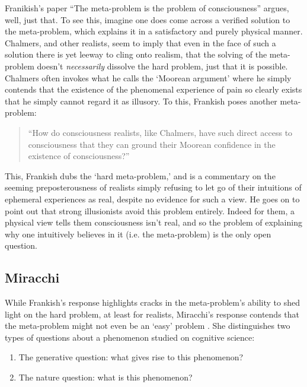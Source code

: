 \documentclass[11pt]{article}
\begin{document}
Franikish's paper ``The meta-problem is the problem of consciousness'' argues, well, just that. To see this, imagine one does come across a verified solution to the meta-problem, which explains it in a satisfactory and purely physical manner. Chalmers, and other realists, seem to imply that even in the face of such a solution there is yet leeway to cling onto realism, that the solving of the meta-problem doesn't \textit{necessarily} dissolve the hard problem, just that it is possible. Chalmers often invokes what he calls the `Moorean argument' where he simply contends that the existence of the phenomenal experience of pain so clearly exists that he simply cannot regard it as illusory. To this, Frankish poses another meta-problem:
\begin{quote}
    ``How do consciousness realists, like Chalmers, have such direct access to consciousness that they can ground their Moorean confidence in the existence of consciousness?'' \cite{Kammerer2019-KAMEID-2}
\end{quote}

This, Frankish dubs the `hard meta-problem,' and is a commentary on the seeming preposterousness of realists simply refusing to let go of their intuitions of ephemeral experiences as real, despite no evidence for such a view. He goes on to point out that strong illusionists avoid this problem entirely. Indeed for them, a physical view tells them consciousness isn't real, and so the problem of explaining why one intuitively believes in it (i.e. the meta-problem) is the only open question.

\subsection*{Miracchi}
While Frankish's response highlights cracks in the meta-problem's ability to shed light on the hard problem, at least for realists, Miracchi's response contends that the meta-problem might not even be an `easy' problem \cite{Miracchi2019-NOT}. She distinguishes two types of questions about a phenomenon studied on cognitive science:
\begin{enumerate}
    \item The generative question: what gives rise to this phenomenon?
    \item The nature question: what is this phenomenon?
\end{enumerate}
\end{document}
